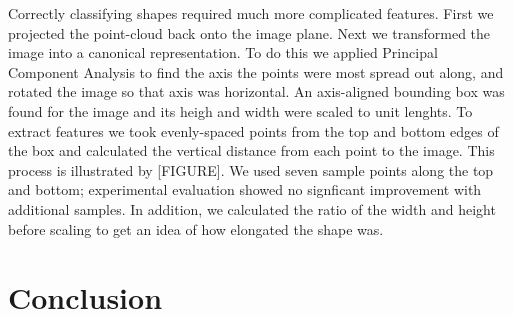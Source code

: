\documentclass[11pt]{article}
\newcommand{\xxx}[1]{{\bf \color{red} #1}}
\begin{document}
Correctly classifying shapes required much more complicated features. First we projected the point-cloud back onto the image plane. Next we transformed the image into a canonical representation. To do this we applied Principal Component Analysis to find the axis the points were most spread out along, and rotated the image so that axis was horizontal. An axis-aligned bounding box was found for the image and its heigh and width were scaled to unit lenghts. To extract features we took evenly-spaced points from the top and bottom edges of the box and calculated the vertical distance from each point to the image. This process is illustrated by [FIGURE]. We used seven sample points along the top and bottom; experimental evaluation showed no signficant improvement with additional samples. In addition, we calculated the ratio of the width and height before scaling to get an idea of how elongated the shape was.




\section{Conclusion}




\end{document}

